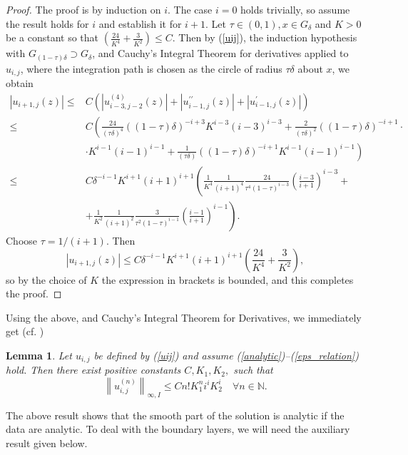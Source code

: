 \documentclass[12pt]{article}
\newtheorem{lemma}[theorem]{Lemma}
\begin{document}
\begin{proof}
%
The proof is by induction on $i$. The case $i=0$ holds trivially, so assume the result holds for $i$ and establish it for $i+1$. 
Let $\tau \in(0,1), x \in G_\delta$ and $K>0$ be a constant so that $\left(\frac{24}{K^4}+\frac{3}{K^2}\right) \leq C$. 
Then by (\ref{uij}), the induction hypothesis with $G_{(1-\tau) \delta} \supset G_\delta$, and Cauchy's Integral Theorem  for derivatives 
applied to $u_{i, j}$, where the integration path is chosen as the circle of radius $\tau \delta$ about $x$, we obtain
$$
\begin{aligned}
\left|u_{i+1, j}(z)\right| \leq & C\left(\left|u_{i-3, j-2}^{(4)}(z)\right|+\left|u_{i-1, j}^{\prime \prime}(z)\right|+\left|u_{i-1, j}^{\prime}(z)\right|\right) \\
\leq & C\left(\frac{24}{(\tau \delta)^4}((1-\tau) \delta)^{-i+3} K^{i-3}(i-3)^{i-3}+\frac{2}{(\tau \delta)^2}((1-\tau) \delta)^{-i+1}\cdot \right. \\
& \left.\cdot K^{i-1}(i-1)^{i-1}+\frac{1}{(\tau \delta)}((1-\tau) \delta)^{-i+1} K^{i-1}(i-1)^{i-1}\right) \\
\leq & C \delta^{-i-1} K^{i+1}(i+1)^{i+1}\left(\frac{1}{K^4} \frac{1}{(i+1)^4} \frac{24}{\tau^4(1-\tau)^{i-3}}\left(\frac{i-3}{i+1}\right)^{i-3}+\right. \\
& \left.+\frac{1}{K^2} \frac{1}{(i+1)^2} \frac{3}{\tau^2(1-\tau)^{i-1}}\left(\frac{i-1}{i+1}\right)^{i-1}\right) .
\end{aligned}
$$
%
Choose $\tau=1 /(i+1)$. Then
$$
\left|u_{i+1, j}(z)\right| \leq C \delta^{-i-1} K^{i+1}(i+1)^{i+1}\left(\frac{24}{K^4}+\frac{3}{K^2}\right),
$$
so by the choice of $K$ the expression in brackets is bounded, and this completes the proof.
\end{proof}

Using the above, and Cauchy's Integral Theorem for Derivatives, we immediately get (cf. \cite{melenk})

\begin{lemma}\label{lem:u_n_ij}
Let $u_{i,j}$ be defined by (\ref{uij}) and assume  (\ref{analytic})--(\ref{eps_relation}) hold. Then there exist
positive constants $C, K_1, K_2,$ such that
%
\begin{equation}
\left\|u_{i, j}^{(n)}\right\|_{\infty, I} \leq C n ! K_1^n i^i K_2^i \quad \forall n \in \mathbb{N} .
\end{equation}
%
\end{lemma}
%

The above result shows that the smooth part of the solution is analytic if the data are analytic. To deal with the boundary layers, we will need the auxiliary result given below.
\end{document}
